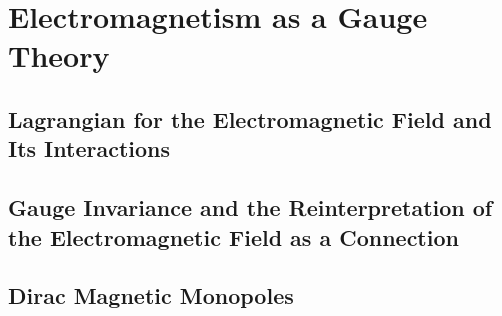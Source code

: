 \setcounter{chapter}{0}
\renewcommand{\thechapter}{9}
\chapter{Electromagnetism as a Gauge Theory}
\setcounter{equation}{0}	        %

\section{Lagrangian for the Electromagnetic Field and Its Interactions}

\section{Gauge Invariance and the Reinterpretation of the Electromagnetic Field as a Connection}

\section{Dirac Magnetic Monopoles}




